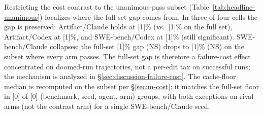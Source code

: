 Restricting the cost contrast to the unanimous-pass subset
(Table~\ref{tab:headline-unanimous}) localizes where the full-set
gap comes from. In three of four cells the gap is preserved: Artifact/Claude
holds at
[1]\%
(vs.\
[1]\%
on the full set), Artifact/Codex at
[1]\%,
and SWE-bench/Codex at
[1]\%
(still significant). SWE-bench/Claude collapses: the full-set
[1]\%
gap (NS) drops to
[1]\%
(NS) on the subset where every arm passes. The full-set gap is therefore
a failure-cost effect concentrated on doomed-run trajectories, not a
per-edit tax on successful runs; the mechanism is analyzed in
\S\ref{sec:discussion-failure-cost}. The cache-floor median is
recomputed on the subset per \S\ref{sec:m-cost}; it matches the full-set
floor in
[0]
of
[0]
(benchmark, seed, agent, arm) groups, with both exceptions on rival
arms (not the contrast arm) for a single SWE-bench/Claude seed.

